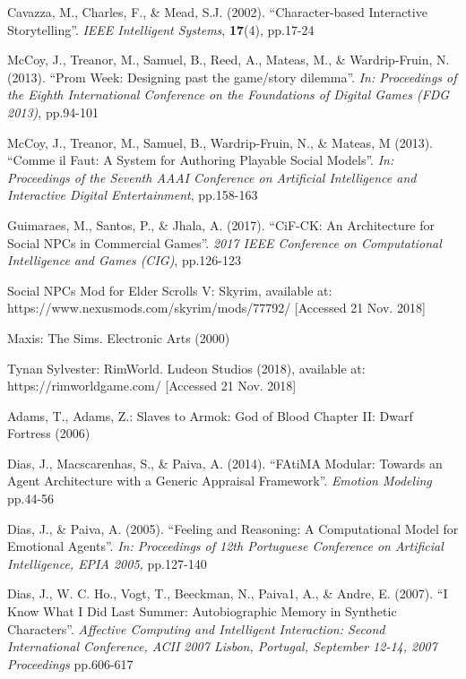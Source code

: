 \documentclass{sig-alternate-05-2015}
\begin{document}
\begin{thebibliography}{20}
Cavazza, M., Charles, F., \& Mead, S.J. (2002).
``Character-based Interactive Storytelling''.
\textit{IEEE Intelligent Systems}, \textbf{17}(4), pp.17-24

McCoy, J., Treanor, M., Samuel, B., Reed, A., Mateas, M., \& Wardrip-Fruin, N. (2013).
``Prom Week: Designing past the game/story dilemma''.
\textit{In: Proceedings of the Eighth International Conference on the Foundations of Digital Games (FDG 2013)}, pp.94-101

McCoy, J., Treanor, M., Samuel, B., Wardrip-Fruin, N., \& Mateas, M (2013).
``Comme il Faut: A System for Authoring Playable Social Models''.
\textit{In: Proceedings of the Seventh AAAI Conference on Artificial Intelligence and Interactive Digital Entertainment}, pp.158-163

Guimaraes, M., Santos, P., \& Jhala, A. (2017).
``CiF-CK: An Architecture for Social NPCs in Commercial Games''.
\textit{2017 IEEE Conference on Computational Intelligence and Games (CIG)}, pp.126-123

Social NPCs Mod for Elder Scrolls V: Skyrim, available at: https://www.nexusmods.com/skyrim/mods/77792/ [Accessed 21 Nov. 2018]

Maxis: The Sims. Electronic Arts (2000)

Tynan Sylvester: RimWorld. Ludeon Studios (2018), available at: https://rimworldgame.com/ [Accessed 21 Nov. 2018]

Adams, T., Adams, Z.: Slaves to Armok: God of Blood Chapter II: Dwarf Fortress (2006)

Dias, J., Macscarenhas, S., \& Paiva, A. (2014).
``FAtiMA Modular: Towards an Agent Architecture with
a Generic Appraisal Framework''.
\textit{Emotion Modeling} pp.44-56

Dias, J., \& Paiva, A. (2005).
``Feeling and Reasoning: A Computational Model for Emotional Agents''.
\textit{In: Proceedings of 12th Portuguese Conference on Artificial Intelligence, EPIA 2005,} pp.127-140

Dias, J., W. C. Ho., Vogt, T., Beeckman, N., Paiva1, A., \& Andre, E. (2007).
``I Know What I Did Last Summer: Autobiographic Memory in Synthetic Characters''.
\textit{Affective Computing and Intelligent Interaction: Second International Conference, ACII 2007 Lisbon, Portugal, September 12-14, 2007 Proceedings} pp.606-617


\end{thebibliography}
\end{document}
